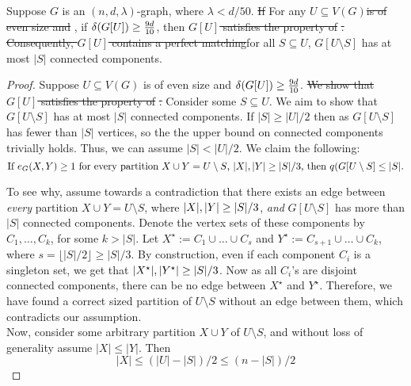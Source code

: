 \documentclass[11pt]{article}
\providecommand{\DIFadd}[1]{\textcolor{shin-ryoku}{#1}}%
\providecommand{\DIFdel}[1]{\textcolor{verylightgray}{\sout{#1}}}                      %
\providecommand{\DIFaddbegin}{} %
\providecommand{\DIFaddend}{} %
\providecommand{\DIFdelbegin}{} %
\providecommand{\DIFdelend}{} %
\begin{document}
\begin{lemma}\label{thm:perfect-matching}
Suppose $G$ is an $(n, d, \lambda)$-graph, where $\lambda < d/50$. 
\DIFdelbegin \DIFdel{If }\DIFdelend \DIFaddbegin \DIFadd{For any }\DIFaddend $U \subseteq V(G)$\DIFdelbegin \DIFdel{is of even size and }\DIFdelend \DIFaddbegin \DIFadd{, if }\DIFaddend $\delta(G[U]) \ge \cTilde$, then \DIFdelbegin \DIFdel{$G[U]$ satisfies the property of }%
\DIFdel{. Consequently, $G[U]$ contains a perfect matching}\DIFdelend \DIFaddbegin \DIFadd{for all $S \subseteq U$, $G[U \setminus S]$ has at most $|S|$ connected components}\DIFaddend . 
\end{lemma}

\begin{proof}
  Suppose $U \subseteq V(G)$ is of even size and $\delta(G[U]) \ge \cTilde$.
  \DIFdelbegin \DIFdel{We show that $G[U]$ satisfies the property of }%
\DIFdel{.
  }\DIFdelend %
  Consider some $S \subseteq U$.
  We aim to show that $G[U \setminus S]$ has at most $|S|$ connected components.
  If $|S| \ge |U|/2$ then as $G[U \setminus S]$ has fewer than $|S|$ vertices, so the the upper bound on connected components trivially holds. 
Thus, we can assume $|S| < |U|/2$.
 We claim the following:
 \DIFdelbegin \rajko{\DIFdel{Rephrased}}
\DIFdelend %
 \begin{equation}
  \text{If }\CutEdges{X}{Y}{G} \ge 1 \text{ for every partition $X \cup Y = U \setminus S$, $|X|,|Y| \ge |S|/3$,  then }  q(G[U \setminus S] \le |S|. \label{eq:mini-claim}
 \end{equation}

\flushleft
To see why, assume towards a contradiction that there exists an edge between \emph{every} partition $X \cup Y = U \setminus S$, where $|X|, |Y| \ge \Size{S}/3$, \emph{and} $G[U \setminus S]$ has more than $|S|$ connected components. Denote the  vertex sets of these components by $C_1, \ldots, C_k$, for some $k > |S|$.
Let $X^\star := C_1 \cup \ldots \cup C_{s}$ and $Y^\star := C_{s+1} \cup \ldots \cup C_{k}$, where $s = \lfloor |S|/2 \rfloor \ge |S|/3$.
By construction, even if each component $C_i$ is a singleton set, we get that  $\Size{X^\star}, \Size{Y^\star} \ge \Size{S}/3$.
Now as all $C_i$'s are disjoint connected components, there can be no edge between $X^\star$ and $Y^\star$. Therefore, we have found a correct sized partition of $U \setminus S$ without an edge between them, which contradicts our assumption. \\
\flushleft
Now, consider some arbitrary partition $X \cup Y$ of $U \setminus S$, and without loss of generality assume $|X| \le |Y|$. Then
\begin{equation}
|X| \le (|U| - |S|)/2 \le (n - |S|)/2  \label{eq:upp-X}
\end{equation}


\end{proof}
\end{document}

